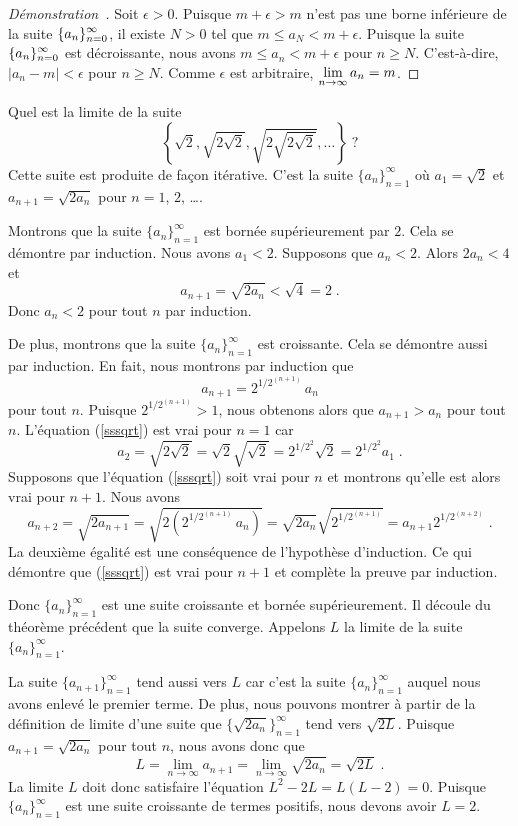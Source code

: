{\begin{proof}[Démonstration\ \theory]
Soit $\epsilon >0$.  Puisque $m+\epsilon > m$ n'est pas une borne
inférieure de la suite $\displaystyle \{ a_n \}_{n=0}^\infty$, il
existe $N>0$ tel que $m \leq a_N < m+\epsilon$.  Puisque la suite
$\displaystyle \{ a_n \}_{n=0}^\infty$ est décroissante, nous avons
$m \leq a_n < m+\epsilon$ pour $n\geq N$.  C'est-à-dire,
$|a_n-m|<\epsilon$ pour $n\geq N$.  Comme $\epsilon$ est arbitraire,
$\displaystyle \lim_{n\to \infty} a_n = m$.
\end{proof}

\begin{egg}[\theory]
Quel est la limite de la suite
\[
\left\{ \sqrt{2}, \sqrt{2\sqrt{2}}, \sqrt{2\sqrt{2\sqrt{2}}}, \ldots
\right\} \; ?
\]
Cette suite est produite de façon itérative. C'est la suite
$\{a_n\}_{n=1}^\infty$ où $a_1=\sqrt{2}$ et $a_{n+1} = \sqrt{2a_n}$
pour $n=1$, $2$, \ldots.

Montrons que la suite $\{a_n\}_{n=1}^\infty$ est bornée
supérieurement par $2$.  Cela se démontre par induction.  Nous avons
$a_1<2$.  Supposons que $a_n < 2$.  Alors $2a_n < 4$ et
\[
a_{n+1} = \sqrt{2a_n} < \sqrt{4} = 2 \; .
\]
Donc $a_n <2$ pour tout $n$ par induction.

De plus, montrons que la suite $\{a_n\}_{n=1}^\infty$ est
croissante.   Cela se démontre aussi par induction.  En fait, nous  montrons
par induction que
\begin{equation}\label{sssqrt}
a_{n+1} = 2^{1/2^{(n+1)}}\,a_n
\end{equation}
pour tout $n$.  Puisque $2^{1/2^{(n+1)}} > 1$, nous obtenons alors que
$a_{n+1} > a_n$ pour tout $n$.  L'équation (\ref{sssqrt}) est vrai
pour $n=1$ car
\[
a_2 = \sqrt{2 \sqrt{2}} = \sqrt{2} \sqrt{\sqrt{2}} =
2^{1/2^2} \sqrt{2} = 2^{1/2^2} a_1 \; .
\]
Supposons que l'équation (\ref{sssqrt}) soit vrai pour $n$ et
montrons qu'elle est alors vrai pour $n+1$.  Nous avons
\[
a_{n+2} = \sqrt{2a_{n+1}} = \sqrt{2 \left(2^{1/2^{(n+1)}} \, a_n\right)}
= \sqrt{2 a_n} \sqrt{2^{1/2^{(n+1)}}}
= a_{n+1} 2^{1/2^{(n+2)}} \; .
\]
La deuxième égalité est une conséquence de l'hypothèse d'induction.
Ce qui démontre que (\ref{sssqrt}) est vrai pour $n+1$ et complète
la preuve par induction.

Donc $\{a_n\}_{n=1}^\infty$ est une suite croissante et
bornée supérieurement.  Il découle du théorème précédent que la suite
converge. Appelons $L$ la limite de la suite $\{a_n\}_{n=1}^\infty$.

La suite $\{ a_{n+1} \}_{n=1}^\infty$ tend aussi vers $L$ car c'est la
suite $\{ a_n\}_{n=1}^\infty$ auquel nous avons enlevé le premier terme.  De
plus, nous pouvons montrer à partir de la définition de limite d'une suite
que $\{ \sqrt{2a_n} \}_{n=1}^\infty$ tend vers $\sqrt{2L}$.  Puisque
$a_{n+1} = \sqrt{2 a_n}$ pour tout $n$, nous avons donc que
\[
L= \lim_{n\rightarrow \infty} a_{n+1} =
\lim_{n\rightarrow \infty} \sqrt{2 a_n} = \sqrt{2L} \; .
\]
La limite $L$ doit donc satisfaire l'équation $L^2-2L = L(L-2) = 0$.
Puisque $\{ a_n \}_{n=1}^\infty$ est une suite croissante de termes
positifs, nous devons avoir $L=2$.
\end{egg}

}

